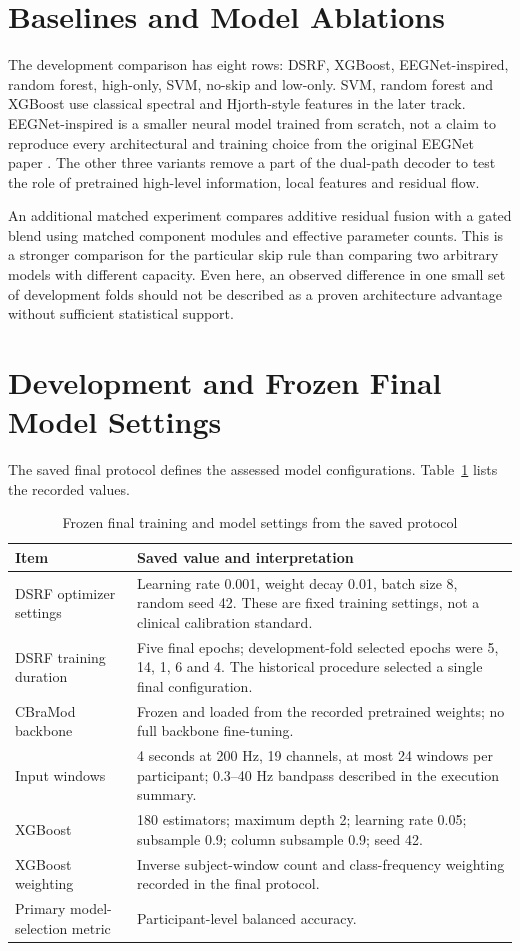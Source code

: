 \section{Baselines and Model Ablations}
The development comparison has eight rows: DSRF, XGBoost, EEGNet-inspired, random forest, high-only, SVM, no-skip and low-only. SVM, random forest and XGBoost use classical spectral and Hjorth-style features in the later track. EEGNet-inspired is a smaller neural model trained from scratch, not a claim to reproduce every architectural and training choice from the original EEGNet paper \cite{lawhern2018}. The other three variants remove a part of the dual-path decoder to test the role of pretrained high-level information, local features and residual flow.

An additional matched experiment compares additive residual fusion with a gated blend using matched component modules and effective parameter counts. This is a stronger comparison for the particular skip rule than comparing two arbitrary models with different capacity. Even here, an observed difference in one small set of development folds should not be described as a proven architecture advantage without sufficient statistical support.

\section{Development and Frozen Final Model Settings}
The saved final protocol defines the assessed model configurations. Table~\ref{tab:hyperparams} lists the recorded values.
\begin{table}[htbp]\centering\small
\caption{Frozen final training and model settings from the saved protocol}\label{tab:hyperparams}
\begin{tabularx}{\textwidth}{@{}p{}X@{}}\toprule
\textbf{Item}&\textbf{Saved value and interpretation}\\\midrule
DSRF optimizer settings&Learning rate 0.001, weight decay 0.01, batch size 8, random seed 42. These are fixed training settings, not a clinical calibration standard.\\
DSRF training duration&Five final epochs; development-fold selected epochs were 5, 14, 1, 6 and 4. The historical procedure selected a single final configuration.\\
CBraMod backbone&Frozen and loaded from the recorded pretrained weights; no full backbone fine-tuning.\\
Input windows&4 seconds at 200 Hz, 19 channels, at most 24 windows per participant; 0.3--40 Hz bandpass described in the execution summary.\\
XGBoost&180 estimators; maximum depth 2; learning rate 0.05; subsample 0.9; column subsample 0.9; seed 42.\\
XGBoost weighting&Inverse subject-window count and class-frequency weighting recorded in the final protocol.\\
Primary model-selection metric&Participant-level balanced accuracy.\\
\bottomrule\end{tabularx}\end{table}

